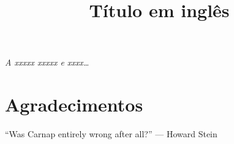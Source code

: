 \documentclass[diss]{UFSM}
\title{Título em inglês}
\begin{document}
\setlength{\baselineskip}{1.5\baselineskip}

\capa


\folharosto



\restoregeometry



\aprovacao



\clearpage
\begin{flushright}
\mbox{}\vfill
{\sffamily\itshape A xxxxx xxxxx e xxxx\ldots}
\end{flushright}



\chapter{Agradecimentos}




\clearpage
\begin{flushright}
\mbox{}\vfill
``Was Carnap entirely wrong after all?'' --- Howard Stein
\end{flushright}


\end{document}
